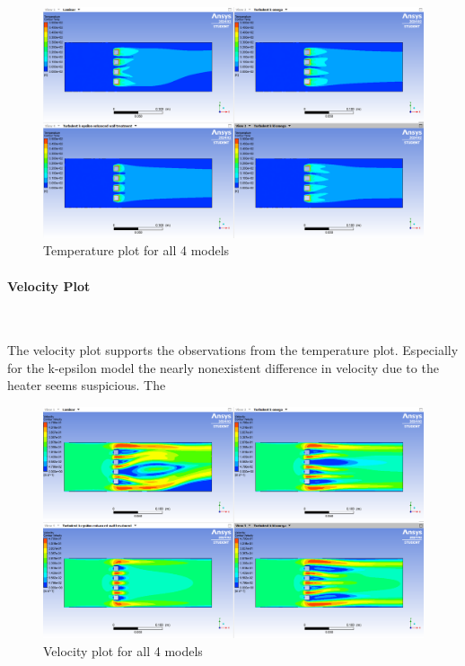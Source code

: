 \begin{figure}[htbp]   
    \centering
    \includegraphics[width=1\textwidth]{img/Temp_plot_comparison.png}
    \caption{Temperature plot for all 4 models}
    \label{fig:temp_plot}
\end{figure}

\paragraph{Velocity Plot}~

The velocity plot supports the observations from the temperature plot.
Especially for the k-epsilon model the nearly nonexistent difference in velocity due to the heater seems suspicious. 
The 


\begin{figure}[htbp]   
    \centering
    \includegraphics[width=1\textwidth]{img/Velocity_plot_comparison.png}
    \caption{Velocity plot for all 4 models}
    \label{fig:velocity_plot}
\end{figure}

